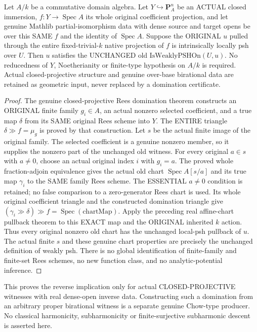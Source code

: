 \begin{theorem}
\label{paper:actual-closed-projective-weakly-psh-converse}
\leanok
{}
Let $A/k$ be a commutative domain algebra. Let $Y\hookrightarrow\mathbf P^n_A$
be an ACTUAL closed immersion, $f:Y\to\operatorname{Spec}A$ its whole original
coefficient projection, and let genuine Mathlib partial-isomorphism data with
dense source and target opens be over this SAME $f$ and the identity of
$\operatorname{Spec}A$. Suppose the ORIGINAL $u$ pulled through the entire
fixed-trivial-$k$ native projection of $f$ is intrinsically locally psh over
$U$. Then $u$ satisfies the UNCHANGED old $\mathrm{IsWeaklyPSHOn}(U,u)$.
No reducedness of $Y$, Noetherianity or finite-type hypothesis on $A/k$ is
required. Actual closed-projective structure and genuine over-base birational
data are retained as geometric input, never replaced by a domination certificate.
\end{theorem}
\begin{proof}
The genuine closed-projective Rees domination theorem constructs an ORIGINAL
finite family $g_i\in A$, an actual nonzero selected coefficient, and a true
map $\delta$ from its SAME original Rees scheme into $Y$. The ENTIRE triangle
$\delta\gg f=\mu_g$ is proved by that construction.
Let $s$ be the actual finite image of the original family. The selected
coefficient is a genuine nonzero member, so it supplies the nonzero part of
the unchanged old witness. For every original $a\in s$ with $a\ne0$, choose
an actual original index $i$ with $g_i=a$. The proved whole fraction-adjoin
equivalence gives the actual old chart $\operatorname{Spec}A[s/a]$ and its
true map $\gamma_i$ to the SAME family Rees scheme. The ESSENTIAL $a\ne0$
condition is retained; no false comparison to a zero-generator Rees chart is
used. Its whole original coefficient triangle and the constructed domination
triangle give
$(\gamma_i\gg\delta)\gg f=\operatorname{Spec}(\mathrm{chartMap})$.
Apply the preceding real affine-chart pullback theorem to this EXACT map and
the ORIGINAL inherited $k$ action. Thus every original nonzero old chart has
the unchanged local-psh pullback of $u$. The actual finite $s$ and these genuine
chart properties are precisely the unchanged definition of weakly psh.
There is no global identification of finite-family and finite-set Rees schemes,
no new function class, and no analytic-potential inference.
\end{proof}

\begin{remark}
This proves the reverse implication only for actual CLOSED-PROJECTIVE witnesses
with real dense-open inverse data. Constructing such a domination from an
arbitrary proper birational witness is a separate genuine Chow-type producer.
No classical harmonicity, subharmonicity or finite-surjective subharmonic descent
is asserted here.
\end{remark}
